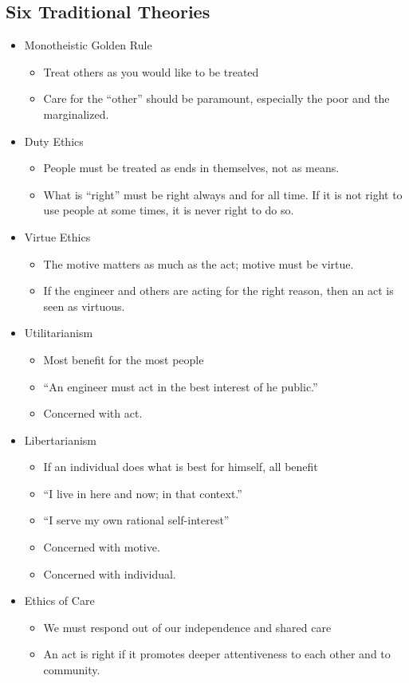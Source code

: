 \documentclass[a4paper]{article}
\numberwithin{equation}{section}
\begin{document}
\subsection{Six Traditional Theories}
\begin{itemize}
    \item Monotheistic Golden Rule
    \begin{itemize}
        \item Treat others as you would like to be treated
        \item Care for the ``other'' should be paramount, especially the poor and the marginalized.
    \end{itemize}
    \item Duty Ethics
    \begin{itemize}
        \item People must be treated as ends in themselves, not as means.
        \item What is ``right'' must be right always and for all time. If it is not right to use people at some times, it is never right to do so. 
    \end{itemize}
    \item Virtue Ethics
    \begin{itemize}
        \item The motive matters as much as the act; motive must be virtue.
        \item If the engineer and others are acting for the right reason, then an act is seen as virtuous.
    \end{itemize}
    \item Utilitarianism
    \begin{itemize}
        \item Most benefit for the most people
        \item ``An engineer must act in the best interest of he public.''
        \item Concerned with act.
    \end{itemize}
    \item Libertarianism
    \begin{itemize}
        \item If an individual does what is best for himself, all benefit
        \item ``I live in here and now; in that context.''
        \item ``I serve my own rational self-interest''
        \item Concerned with motive.
        \item Concerned with individual.
    \end{itemize}
    \item Ethics of Care
    \begin{itemize}
        \item We must respond out of our independence and shared care
        \item An act is right if it promotes deeper attentiveness to each other and to community.
    \end{itemize}
\end{itemize}
\end{document}
